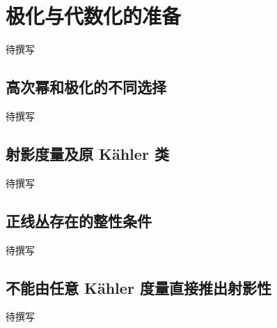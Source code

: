 
% 
% 
% 

\section{极化与代数化的准备}
\label{g4:sec:1905}

待撰写

\subsection{高次幂和极化的不同选择}
\label{g4:subsec:1905:01}
待撰写

\subsection{射影度量及原 Kähler 类}
\label{g4:subsec:1905:02}
待撰写

\subsection{正线丛存在的整性条件}
\label{g4:subsec:1905:03}
待撰写

\subsection{不能由任意 Kähler 度量直接推出射影性}
\label{g4:subsec:1905:04}
待撰写
